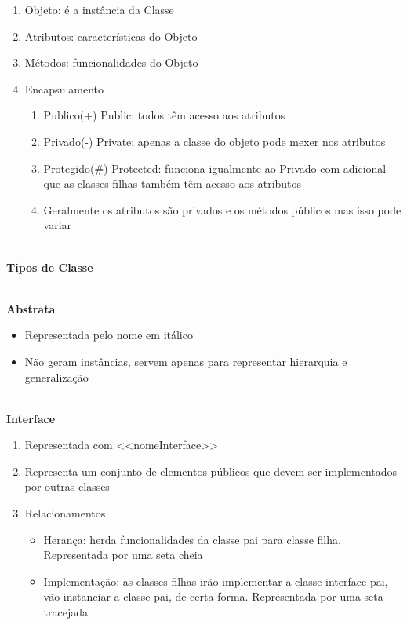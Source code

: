 \documentclass[12pt, a4paper]{article}
\begin{document}
\begin{enumerate}[label*=\textbf{\arabic*}.]

    \item Objeto: é a instância da Classe
    \item Atributos: características do Objeto
    \item Métodos: funcionalidades do Objeto
    \item Encapsulamento
    \begin{enumerate}[label*=\textbf{\arabic*}.]
        \item Publico(+) Public: todos têm acesso aos atributos
        \item Privado(-) Private: apenas a classe do objeto pode mexer nos atributos
        \item Protegido(\#) Protected: funciona igualmente ao Privado 
        com adicional que as classes filhas também têm acesso aos atributos
        \item Geralmente os atributos são privados e os métodos públicos mas isso pode variar
    \end{enumerate}

\end{enumerate}

\newpage

\indent
\textbf{\\Tipos de Classe}

\textbf{\\Abstrata}
\begin{itemize}
    \item Representada pelo nome em itálico
    \item Não geram instâncias, servem apenas para representar hierarquia e generalização
\end{itemize}

\textbf{\\Interface}
\begin{enumerate}[label*=\textbf{\arabic*}.]
    \item Representada com <<nomeInterface>>
    \item Representa um conjunto de elementos públicos 
    que devem ser implementados por outras classes
    \item Relacionamentos
    \begin{itemize}
        \item Herança: herda funcionalidades da classe pai para classe filha. Representada
        por uma seta cheia
        \item Implementação: as classes filhas irão implementar a classe interface pai,
        vão instanciar a classe pai, de certa forma. Representada por uma seta tracejada
    \end{itemize}
\end{enumerate}
\end{document}
